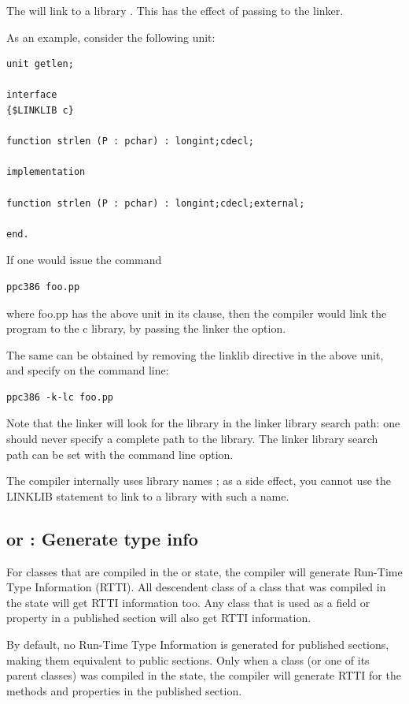 The  will link to a library .
This has the effect of passing  to the linker.

As an example, consider the following unit:
\begin{verbatim}
unit getlen;

interface
{$LINKLIB c}

function strlen (P : pchar) : longint;cdecl;

implementation

function strlen (P : pchar) : longint;cdecl;external;

end.
\end{verbatim}
If one would issue the command
\begin{verbatim}
ppc386 foo.pp
\end{verbatim}
where foo.pp has the above unit in its  clause,
then the compiler would link the program to the c library, by passing the
linker the  option.

The same can be obtained by removing the linklib directive in the
above unit, and specify  on the command line:
\begin{verbatim}
ppc386 -k-lc foo.pp
\end{verbatim}
Note that the linker will look for the library in the linker library search path:
one should never specify a complete path to the library.
The linker library search path can be set with the  command line option.

\begin{remark}
The compiler internally uses library names ; as a side
effect, you cannot use the LINKLIB statement to link to a library with such
a name.
\end{remark}

\subsection{ or  : Generate type info}
\label{se:dirtypeinfo}

For classes that are compiled in the  or 
state, the compiler will generate Run-Time Type Information (RTTI). All
descendent class of a class that was compiled in the  state
will get RTTI information too. Any class that is used as a field or property 
in a published section will also get RTTI information.

By default, no Run-Time Type Information is generated for published
sections, making them equivalent to public sections. Only when a class
(or one of its parent classes) was compiled in the  state, the
compiler will generate RTTI for the methods and properties in the published
section.

